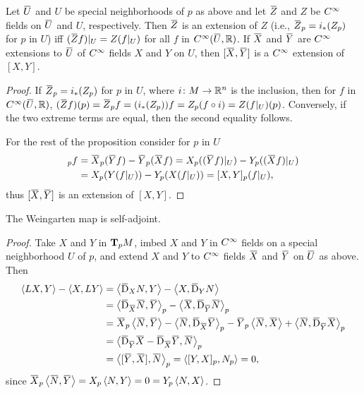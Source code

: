 \documentclass[../main]{subfiles}
\begin{document}
\begin{proposition} \label{prop:ch2.2.1}
Let $\xoverline{U}$ and $U$ be special neighborhoods of $p$ as above and let $\xoverline{Z}$ and $Z$ be $\CInfty$ fields on $\xoverline{U}$ and $U$, respectively. Then $\xoverline{Z}$ is an extension of $Z$ (i.e., $\xoverline{Z}_p=i_*(Z_p)$ for $p$ in $U$) iff $(\xoverline{Z}f)\vert_U=Z(f\vert_U)$ for all $f$ in $\CInfty(\xoverline{U},\bR)$. If $\xoverline{X}$ and $\xoverline{Y}$ are $\CInfty$ extensions to $\xoverline{U}$ of $\CInfty$ fields $X$ and $Y$ on $U$, then $[\xoverline{X},\xoverline{Y}]$ is a $\CInfty$ extension of $[X,Y]$.
\end{proposition}
\begin{proof}
If $\xoverline{Z}_p=i_*(Z_p)$ for $p$ in $U$, where $i\colon M\functionMaps\bR^n$ is the inclusion, then for $f$ in $\CInfty(\xoverline{U},\bR)$, $(\xoverline{Z}f)(p)=\xoverline{Z}_pf=(i_*(Z_p))f=Z_p(f\circ i)=Z(f\vert_U)(p)$. Conversely, if the two extreme terms are equal, then the second equality follows. 

For the rest of the proposition consider for $p$ in $U$
\begin{align*}
    [\xoverline{X},\xoverline{Y}]_pf&=\xoverline{X}_p(\xoverline{Y}f)-\xoverline{Y}_p(\xoverline{X}f)=X_p((\xoverline{Y}f)\vert_U)-Y_p((\xoverline{X}f)\vert_U)\\
    &=X_p(Y(f\vert_U))-Y_p(X(f\vert_U))=[X,Y]_p(f\vert_U),
\end{align*}
thus $[\xoverline{X},\xoverline{Y}]$ is an extension of $[X,Y]$.
\end{proof}

\begin{theorem} \label{thm:ch2.2.2}
The Weingarten map is self-adjoint.
\end{theorem}
\begin{proof}
Take $X$ and $Y$ in $\tangentspace{M}{p}$, imbed $X$ and $Y$ in $\CInfty$ fields on a special neighborhood $U$ of $p$, and extend $X$ and $Y$ to $\CInfty$ fields $\xoverline{X}$ and $\xoverline{Y}$ on $\xoverline{U}$ as above. Then
\begin{align*}
    \ip{LX}{Y}-\ip{X}{LY}&=\ip{\covariant_XN}{Y}-\ip{X}{\covariant_YN}\\
    &=\ip{\covariant_{\xoverline{X}}\xoverline{N}}{\xoverline{Y}}_p-\ip{\xoverline{X}}{\covariant_{\xoverline{Y}}\xoverline{N}}_p\\
    &=\xoverline{X}_p\ip{\xoverline{N}}{\xoverline{Y}}-\ip{\xoverline{N}}{\covariant_{\xoverline{X}}\xoverline{Y}}_p-\xoverline{Y}_p\ip{\xoverline{N}}{\xoverline{X}}+\ip{\xoverline{N}}{\covariant_{\xoverline{Y}}\xoverline{X}}_p\\
    &=\ip{\covariant_{\xoverline{Y}}\xoverline{X}-\covariant_{\xoverline{X}}\xoverline{Y}}{\xoverline{N}}_p\\
    &=\ip{[\xoverline{Y},\xoverline{X}]}{\xoverline{N}}_p=\ip{[Y,X]_p}{N_p}=0,
\end{align*}
since $\xoverline{X}_p\ip{\xoverline{N}}{\xoverline{Y}}=X_p\ip{N}{Y}=0=Y_p\ip{N}{X}$.
\end{proof}
\end{document}
